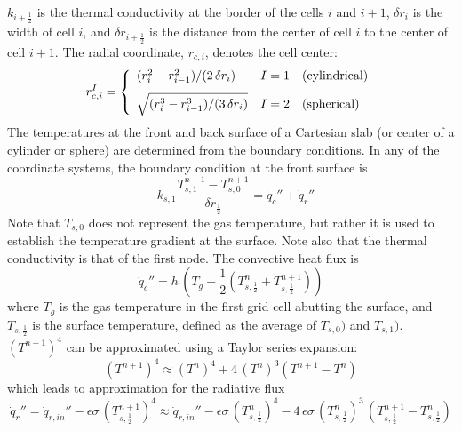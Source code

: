 $k_{i+\frac{1}{2}}$ is the thermal conductivity at the border of the cells $i$ and $i+1$, $\delta r_i$ is the width of cell $i$, and  $\delta r_{i+\frac{1}{2}}$ is the distance from the center of cell $i$ to the center of cell $i+1$. The radial coordinate, $r_{c,i}$, denotes the cell center:
\begin{equation}
r_{c,i}^I = \left\{
\begin{array}{ll} (r_i^2 - r_{i-1}^2)/(2 \, \delta r_i)            & I=1 \quad \hbox{(cylindrical)} \\ [0.1in]
                   \sqrt{ ( r_i^3 - r_{i-1}^3)/(3 \, \delta r_i) } & I=2 \quad \hbox{(spherical)}
\end{array} \right.
\end{equation}
The temperatures at the front and back surface of a Cartesian slab (or center of a cylinder or sphere) are determined from the boundary conditions. In any of the coordinate systems, the boundary condition at the front surface is
\begin{equation}
\label{bc_front}
 -k_{s,1} \frac{T_{s,1}^{n+1}-T_{s,0}^{n+1}}{\delta r_{\frac{1}{2}}}
  =  \dot{q}_{c}''+\dot{q}_{r}''
\end{equation}
Note that $T_{s,0}$ does not represent the gas temperature, but rather it is used to establish the temperature gradient at the surface. Note also that the thermal conductivity is that of the first node. The convective heat flux is
\begin{equation}
\label{conv}
  \dot{q}_c'' = h \, \left( T_g - \frac{1}{2} \left( T_{s,\frac{1}{2}}^n+T_{s,\frac{1}{2}}^{n+1} \right) \right)
\end{equation}
where $T_g$ is the gas temperature in the first grid cell abutting the surface, and $T_{s,\frac{1}{2}}$ is the surface temperature, defined as the average of $T_{s,0})$ and $T_{s,1})$.
$(T^{n+1})^4$ can be approximated using a Taylor series expansion:
\begin{equation}
\label{T_taylor}
(T^{n+1})^4 \approx (T^n)^4 + 4 \, (T^n)^3 (T^{n+1}-T^n)
\end{equation}
which leads to approximation for the radiative flux
\begin{equation}
\label{radi}
\dot{q}_r'' = \dot{q}_{r, in}'' - \epsilon \sigma \, \left( T_{s,\frac{1}{2}}^{n+1} \right)^4
  \approx \dot{q}_{r, in}'' - \epsilon \sigma \, \left( T_{s,\frac{1}{2}}^n \right)^4 - 4 \, \epsilon\sigma \, \left( T_{s,\frac{1}{2}}^n \right)^3 \, \left( T_{s,\frac{1}{2}}^{n+1}-T_{s,\frac{1}{2}}^n \right)
\end{equation}
